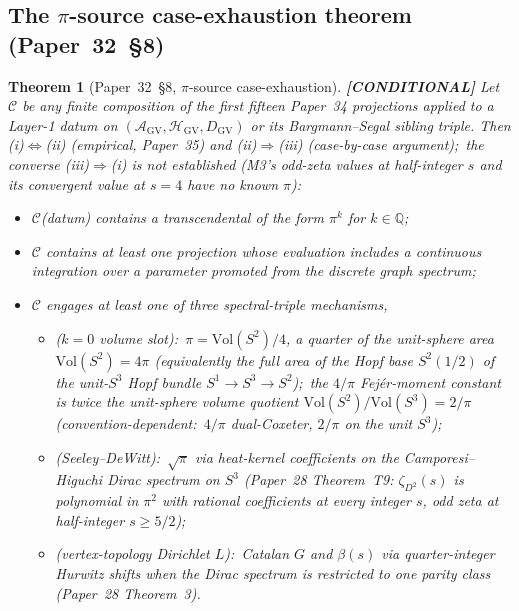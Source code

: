 \documentclass[11pt,a4paper]{article}
\theoremstyle{plain}
\newtheorem{theorem}{Theorem}[section]
\theoremstyle{definition}
\newcommand{\sthree}{S^{3}}
\newcommand{\HGV}{\mathcal{H}_{\mathrm{GV}}}
\newcommand{\AGV}{\mathcal{A}_{\mathrm{GV}}}
\newcommand{\DGV}{D_{\mathrm{GV}}}
\newcommand{\Q}{\mathbb{Q}}
\newcommand{\Vol}{\mathrm{Vol}}
\begin{document}
\subsection{The $\pi$-source case-exhaustion theorem (Paper~32~\S 8)}

\begin{theorem}[Paper~32~\S 8, $\pi$-source case-exhaustion]
\label{thm:pi_source}
\textbf{[CONDITIONAL]} Let $\mathcal{C}$ be any finite composition of
the first fifteen Paper~34 projections applied to a Layer-1 datum on
$(\AGV, \HGV, \DGV)$ or its Bargmann--Segal sibling triple.  Then
(i)$\Leftrightarrow$(ii) (empirical, Paper~35) and (ii)$\Rightarrow$(iii)
(case-by-case argument);\ the converse (iii)$\Rightarrow$(i) is
not established (M3's odd-zeta values at half-integer $s$ and its
convergent value at $s = 4$ have no known $\pi$):
\begin{itemize}\setlength\itemsep{0pt}
\item[(i)] $\mathcal{C}$(datum) contains a transcendental of the form
$\pi^{k}$ for $k \in \Q$;
\item[(ii)] $\mathcal{C}$ contains at least one projection whose
evaluation includes a continuous integration over a parameter
promoted from the discrete graph spectrum;
\item[(iii)] $\mathcal{C}$ engages at least one of three
spectral-triple mechanisms,
\begin{itemize}\setlength\itemsep{0pt}
\item[$M_{1}$] (\emph{$k = 0$ volume slot}):\
$\pi = \Vol(S^{2})/4$, a quarter of the unit-sphere area $\Vol(S^2) = 4\pi$ (equivalently the full area of the Hopf base $S^2(1/2)$ of the unit-$S^3$
Hopf bundle $S^{1} \to \sthree \to S^{2}$);\ the $4/\pi$ Fej\'er-moment constant is twice the unit-sphere
volume quotient $\Vol(S^2)/\Vol(\sthree) = 2/\pi$ (convention-dependent:\ $4/\pi$ dual-Coxeter, $2/\pi$ on the unit $\sthree$);
\item[$M_{2}$] (\emph{Seeley--DeWitt}):\
$\sqrt{\pi}$ via heat-kernel coefficients on the Camporesi--Higuchi
Dirac spectrum on $\sthree$ (Paper~28 Theorem~T9:
$\zeta_{D^{2}}(s)$ is polynomial in $\pi^{2}$ with rational
coefficients at every integer $s$, odd zeta at half-integer $s \ge 5/2$);
\item[$M_{3}$] (\emph{vertex-topology Dirichlet $L$}):\
Catalan $G$ and $\beta(s)$ via quarter-integer Hurwitz shifts when the
Dirac spectrum is restricted to one parity class (Paper~28 Theorem~3).
\end{itemize}
\end{itemize}
\end{theorem}
\end{document}
